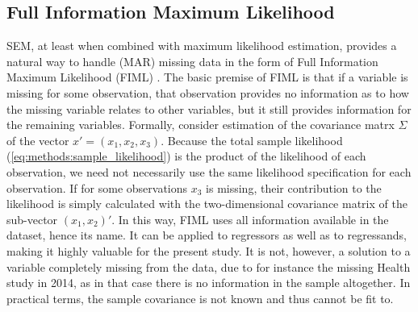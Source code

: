 \subsection{Full Information Maximum Likelihood}
\label{sec:methods:fiml}
SEM, at least when combined with maximum likelihood estimation, provides a natural way to handle (MAR) missing data in the
form of Full Information Maximum Likelihood (FIML) \cite{arbuckle2013full}.
The basic premise of FIML is that if a variable is missing for some observation, that observation provides no information
as to how the missing variable relates to other variables, but it still provides information for the remaining variables.
Formally, consider estimation of the covariance matrx $\Sigma$ of the vector $x' = (x_1, x_2, x_3)$.
Because the total sample likelihood (\cref{eq:methods:sample_likelihood}) is the product of the likelihood of each observation,
we need not necessarily use the same likelihood specification for each observation.
If for some observations $x_3$ is missing, their contribution to the likelihood is simply calculated with the two-dimensional
covariance matrix of the sub-vector $(x_1, x_2)'$.
In this way, FIML uses all information available in the dataset, hence its name. It can be applied to regressors
as well as to regressands, making it highly valuable for the present study.
It is not, however, a solution to a variable completely missing from the data, due to for instance the missing Health
study in 2014, as in that case there is no information in the sample altogether. In practical terms, the sample covariance
is not known and thus cannot be fit to.

